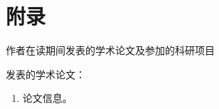 
\chapter*{附录}

{\centering
作者在读期间发表的学术论文及参加的科研项目\par
}

发表的学术论文：
\begin{enumerate}
    \item 论文信息。
\end{enumerate}

